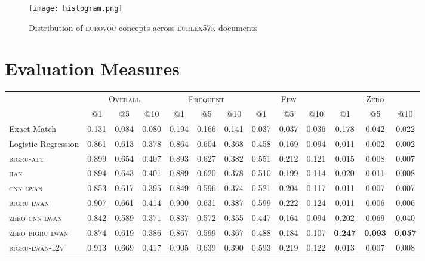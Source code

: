 \documentclass[11pt,a4paper]{article}
\newcommand{\bigruatt}{\textsc{bigru-att}\xspace}
\newcommand{\han}{\textsc{han}\xspace}
\newcommand{\lwancnn}{\textsc{cnn-lwan}\xspace}
\newcommand{\zlwancnn}{\textsc{zero-cnn-lwan}\xspace}
\newcommand{\lwangru}{\textsc{bigru-lwan}\xspace}
\newcommand{\lwangrulv}{\textsc{bigru-lwan-l2v}}
\newcommand{\zlwangru}{\textsc{zero-bigru-lwan}\xspace}
\newcommand{\newdata}{\textsc{eurlex57k}\xspace}
\newcommand{\eurovoc}{\textsc{eurovoc}\xspace}
\begin{document}
\begin{figure}[t!]
  \centering
    \texttt{[image: histogram.png]}
  \caption{Distribution of \eurovoc concepts across \newdata documents}
  \label{fig:histogram}
\end{figure}

\section{Evaluation Measures}

\begin{table*}[ht!]
\centering
{
\footnotesize\addtolength{\tabcolsep}{-2pt}
\begin{tabular}{lcccccccccccc}
  \hline
  & \multicolumn{3}{c}{\textsc{Overall}} & \multicolumn{3}{c}{\textsc{Frequent}} & \multicolumn{3}{c}{\textsc{Few}} & \multicolumn{3}{c}{\textsc{Zero}} \\ 
  & @1 & @5 & @10 & @1 & @5 & @10 & @1 & @5 & @10 & @1 & @5 & @10 \\
  \cline{2-13}
  Exact Match & 0.131 & 0.084 & 0.080 & 0.194 & 0.166 & 0.141 & 0.037 & 0.037 & 0.036 & 0.178 & 0.042 & 0.022 \\
  Logistic Regression & 0.861 & 0.613 & 0.378 & 0.864 & 0.604 & 0.368 & 0.458 & 0.169 & 0.094 & 0.011 & 0.002 & 0.002 \\
  \hline
  \bigruatt & 0.899 & 0.654 & 0.407 & 0.893 & 0.627 & 0.382 & 0.551 & 0.212 & 0.121 & 0.015 & 0.008 & 0.007 \\
  \han & 0.894 & 0.643 & 0.401 & 0.889 & 0.620 & 0.378 & 0.510 & 0.199 & 0.114 & 0.020 & 0.011 & 0.008 \\
  \hline
 \lwancnn & 0.853 & 0.617 & 0.395 & 0.849 & 0.596 & 0.374 & 0.521 & 0.204 & 0.117 & 0.011 & 0.007 & 0.007 \\
  \lwangru & \underline{0.907} & \underline{0.661} & \underline{0.414} & \underline{0.900} & \underline{0.631} & \underline{0.387} & \underline{0.599} & \underline{0.222} & \underline{0.124} & 0.011 & 0.006 & 0.006 \\
   \hline
  \zlwancnn & 0.842 & 0.589 & 0.371 & 0.837 & 0.572 & 0.355 & 0.447 & 0.164 & 0.094 & \underline{0.202} & \underline{0.069} & \underline{0.040} \\
  \zlwangru & 0.874 & 0.619 & 0.386 & 0.867 & 0.599 & 0.367 & 0.488 & 0.184 & 0.107 & \textbf{0.247} & \textbf{0.093} & \textbf{0.057} \\
  \hline\hline
   \lwangrulv & 0.913 & 0.669 & 0.417 & 0.905 & 0.639 & 0.390 & 0.593 & 0.219 & 0.122 & 0.013 & 0.007 & 0.008 \\

\end{tabular}}
\end{table*}
\end{document}
